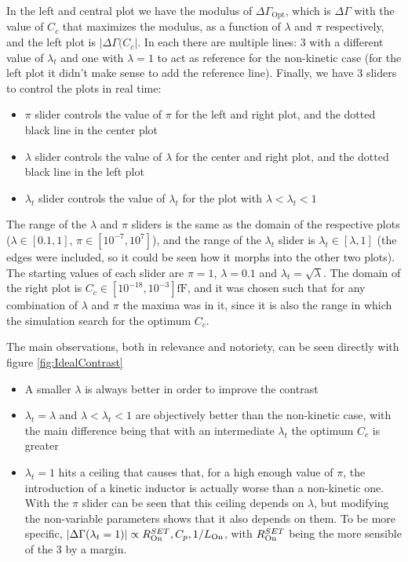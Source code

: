 \documentclass[../main.tex]{subfiles}
\begin{document}
In the left and central plot we have the modulus of \(\Delta\Gamma_{\text{Opt}}\),
which is \(\Delta\Gamma\) with the value of \(C_{c}\) that maximizes the modulus,
as a function of \(\lambda\) and \(\pi\) respectively, and the left plot
is \(|\Delta\Gamma(C_{c}|\). In each there are multiple lines: 3 with a different
value of \(\lambda_{t}\) and one with \(\lambda = 1\) to act as reference for
the non-kinetic case (for the left plot it didn't make sense to add the reference
line). Finally, we have 3 sliders to control the plots in real time:

\begin{itemize}
    \item \(\pi\) slider controls the value of \(\pi\) for the left and right
        plot, and the dotted black line in the center plot
    \item \(\lambda\) slider controls the value of \(\lambda\) for the center
        and right plot, and the dotted black line in the left plot
    \item \(\lambda_{t}\) slider controls the value of \(\lambda_{t}\) for
        the plot with \(\lambda < \lambda_{t} < 1\)
\end{itemize}

The range of the \(\lambda\) and \(\pi\) sliders is the same as the domain
of the respective plots (\(\lambda \in [0.1, 1]\), \(\pi \in [10^{-7}, 10^{7}]\)),
and the range of the \(\lambda_{t}\) slider is \(\lambda_{t} \in [\lambda, 1]\)
(the edges were included, so it could be seen how it morphs into the other two plots).
The starting values of each slider are \(\pi = 1\), \(\lambda = 0.1\) and
\(\lambda_{t} = \sqrt\lambda\).
The domain of the right plot is \(C_{c} \in [10^{-18}, 10^{-3}]\unit{\fF}\), and it
was chosen such that for any combination of \(\lambda\) and \(\pi\) the maxima
was in it, since it is also the range in which the simulation search for the
optimum \(C_{c}\).

The main observations, both in relevance and notoriety, can be seen directly
with figure \ref{fig:IdealContrast}
\begin{itemize}
    \item A smaller \(\lambda\) is always better in order to improve the contrast
    \item \(\lambda_{t} = \lambda\) and \(\lambda < \lambda_{t} < 1\) are objectively better
        than the non-kinetic case, with the main difference being that with an
        intermediate \(\lambda_{t}\) the optimum \(C_{c}\) is greater
    \item \(\lambda_{t} = 1\) hits a ceiling that causes that, for a high enough
        value of \(\pi\), the introduction of a kinetic inductor is actually worse
        than a non-kinetic one. With the \(\pi\) slider can be seen that this
        ceiling depends on \(\lambda\), but modifying the non-variable parameters
        shows that it also depends on them. To be more specific,
        \(|\Delta\Gamma(\lambda_{t} = 1)|\propto R_{\text{On}}^{SET}, C_{p}, 1/L_{\text{On}}\),
        with \(R_{\text{On}}^{SET}\) being the more sensible of the 3 by a margin.
\end{itemize}
\end{document}
